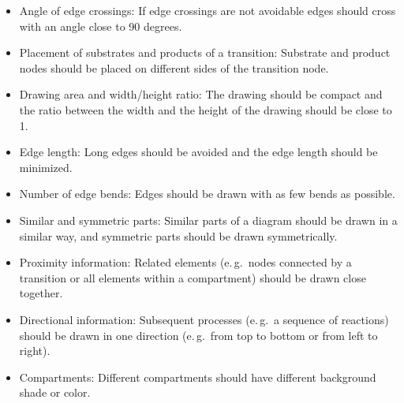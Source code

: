 \begin{itemize}
  \item Angle of edge crossings: If edge crossings are not avoidable
  edges should cross with an angle close to 90 degrees.
  \item Placement of substrates and products of a transition:
  Substrate and product nodes should be placed
  on different sides of the transition node.
  \item Drawing area and width/height ratio: The drawing should
  be compact and the ratio between the width and the height
  of the drawing should be close to 1.
  \item Edge length: Long edges should be avoided and the
  edge length should be minimized.
  \item Number of edge bends: Edges should be drawn with
  as few bends as possible.
  \item Similar and symmetric parts: Similar parts of a diagram
  should be drawn in a similar way, and symmetric parts
  should be drawn symmetrically.
  \item Proximity information: Related elements (e.\,g.~nodes
  connected by a transition or all elements within a compartment)
  should be drawn close together.
  \item Directional information: Subsequent processes (e.\,g.~a sequence
  of reactions) should be drawn in one direction (e.\,g.~from
  top to bottom or from left to right).
  \item Compartments: Different compartments should have different
  background shade or color.
\end{itemize}
